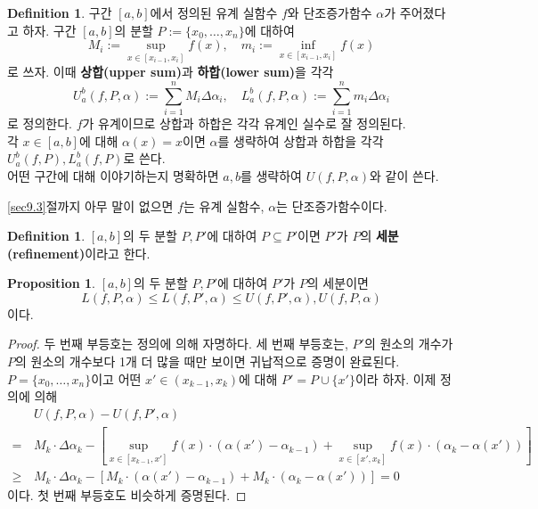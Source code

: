 \documentclass[11pt]{book}
\numberwithin{equation}{chapter}
\newcommand{\sqbracket}[1]{\left[#1\right]}
\theoremstyle{definition}
\newtheorem{prop}[thm]{Proposition}
\newtheorem{defn}[thm]{Definition}
\begin{document}
\begin{defn}
    구간 \([a, b]\)에서 정의된 유계 실함수 \(f\)와 단조증가함수 \(\alpha\)가 주어졌다고 하자. 구간 \([a, b]\)의 분할 \(P := \{x_0, \ldots, x_n\}\)에 대하여
    \[
        M_i := \sup_{x \in [x_{i-1}, x_i]} f(x), \quad m_i := \inf_{x \in [x_{i-1}, x_i]} f(x)
    \]
    로 쓰자. 이때 \textbf{상합(upper sum)}과 \textbf{하합(lower sum)}을 각각
    \[
        U_a^b(f, P, \alpha) := \sum_{i=1}^n M_i \Delta \alpha_i, \quad L_a^b(f, P, \alpha) := \sum_{i=1}^n m_i \Delta \alpha_i
    \]
    로 정의한다. \(f\)가 유계이므로 상합과 하합은 각각 유계인 실수로 잘 정의된다.\\
    각 \(x \in [a, b]\)에 대해 \(\alpha(x) = x\)이면 \(\alpha\)를 생략하여 상합과 하합을 각각 \(U_a^b(f, P), L_a^b(f, P)\)로 쓴다.\\
    어떤 구간에 대해 이야기하는지 명확하면 \(a, b\)를 생략하여 \(U(f, P, \alpha)\)와 같이 쓴다.
\end{defn}

\ref{sec9.3}절까지 아무 말이 없으면 \(f\)는 유계 실함수, \(\alpha\)는 단조증가함수이다.

\begin{defn}
    \([a, b]\)의 두 분할 \(P, P'\)에 대하여 \(P \subseteq P'\)이면 \(P'\)가 \(P\)의 \textbf{세분(refinement)}이라고 한다.
\end{defn}

\begin{prop} \label{9.1.5}
    \([a, b]\)의 두 분할 \(P, P'\)에 대하여 \(P'\)가 \(P\)의 세분이면
    \[
        L(f, P, \alpha) \le L(f, P', \alpha) \le U(f, P', \alpha), U(f, P, \alpha)
    \]
    이다.
\end{prop}
\begin{proof}
    두 번째 부등호는 정의에 의해 자명하다. 세 번째 부등호는, \(P'\)의 원소의 개수가 \(P\)의 원소의 개수보다 1개 더 많을 때만 보이면 귀납적으로 증명이 완료된다. \(P = \{x_0, \ldots, x_n\}\)이고 어떤 \(x' \in (x_{k-1}, x_k)\)에 대해 \(P' = P \cup \{x'\}\)이라 하자. 이제 정의에 의해
    \begin{align*}
        &U(f, P, \alpha) - U(f, P', \alpha)\\
        =\,& M_k \cdot \Delta \alpha_k - \sqbracket{\sup_{x \in [x_{k-1}, x']} f(x) \cdot (\alpha(x') - \alpha_{k-1}) + \sup_{x \in [x', x_k]} f(x) \cdot (\alpha_k - \alpha(x'))}\\
        \ge\,& M_k \cdot \Delta \alpha_k - \sqbracket{M_k \cdot (\alpha(x') - \alpha_{k-1}) + M_k \cdot (\alpha_k - \alpha(x'))} = 0
    \end{align*}
    이다. 첫 번째 부등호도 비슷하게 증명된다.
\end{proof}
\end{document}
